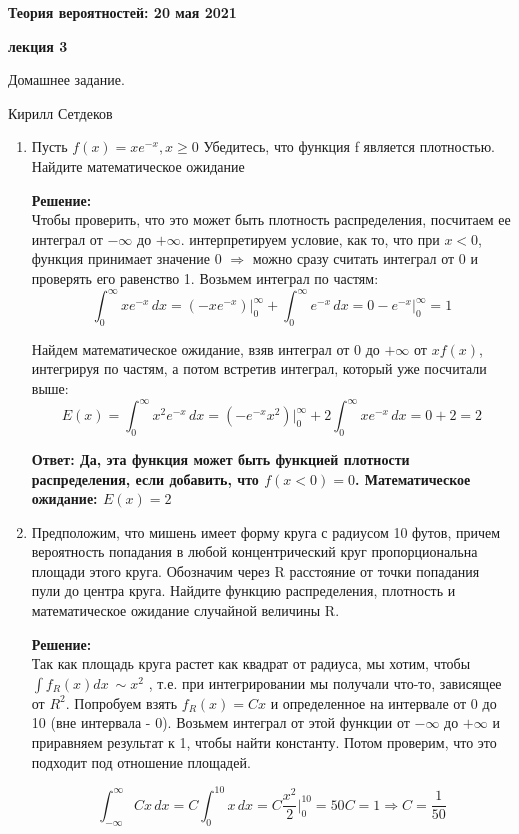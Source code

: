 \documentclass[a4paper,12pt]{article}
\renewcommand{\geq}{\geqslant}
\newcounter{z}
\renewcommand{\date}{{\bf 20 мая 2021}}
\newcommand{\HSEhat}{
\vspace*{-0pt}
\noindent
\setcounter{z}{0}


{\bf \phantom{\date}  \large \hfill Теория вероятностей: \hfill \normalsize \date}

\vspace{5 pt}
{\bf \large \hfill  лекция 3\hfill }

\vspace{15 pt}
\centerline{ \large  Домашнее задание.}
\centerline{ \large  Кирилл Сетдеков}



\vspace*{10pt}
\setcounter{z}{0}

}
\begin{document}
\HSEhat


\begin{enumerate}

\subsection*{Задачи:}



\item Пусть $f(x) = x e^{-x}, x\geq 0$  Убедитесь, что функция f является плотностью. Найдите математическое ожидание 

\textbf{Решение:}\\
Чтобы проверить, что это может быть плотность распределения, посчитаем ее интеграл от $-\infty$ до $+\infty$. интерпретируем условие, как то, что при $x<0$, функция принимает значение 0 $\Rightarrow$ можно сразу считать интеграл от 0 и проверять его равенство 1. Возьмем интеграл по частям:
$$\int_{0}^{\infty} x e^{-x}\,dx=(-xe^{-x})\Big|_0^\infty+\int_{0}^{\infty} e^{-x}\,dx=0-e^{-x}\Big|_0^\infty=1$$


Найдем математическое ожидание, взяв интеграл от 0 до $+\infty$ от $xf(x)$, интегрируя по частям, а потом встретив интеграл, который уже посчитали выше:
$$E(x) = \int_{0}^{\infty} x^2 e^{-x}\,dx = (-e^{-x}x^2)\Big|_0^\infty+2\int_{0}^{\infty} x e^{-x}\,dx=0+2=2$$

\textbf{Ответ: Да, эта функция может быть функцией плотности распределения, если добавить, что $f(x<0) = 0$. Математическое ожидание: $E(x) = 2$} 


\item Предположим, что мишень имеет форму круга с радиусом 10 футов, причем вероятность попадания в любой концентрический круг пропорциональна площади этого круга. Обозначим через R расстояние от точки попадания пули до центра круга. Найдите функцию распределения, плотность и математическое ожидание случайной величины R. 

\textbf{Решение:}\\
Так как площадь круга растет как квадрат от радиуса, мы хотим, чтобы $\int f_{R}(x) dx\ \sim x^2$ , т.е. при интегрировании мы получали что-то, зависящее от $R^2$.
Попробуем взять $ f_{R}(x) = Cx$ и определенное на интервале от 0 до 10 (вне интервала - 0). Возьмем интеграл от этой функции от $-\infty$ до $+\infty$ и приравняем результат к 1, чтобы найти константу. Потом проверим, что это подходит под отношение площадей.

$$\int_{-\infty}^{\infty} Cx\,dx=C\int_{0}^{10} x\,dx=C\frac{x^2}{2}\Big|_0^{10}=50C=1 \Rightarrow C = \frac{1}{50}$$


\end{enumerate}
\end{document}
